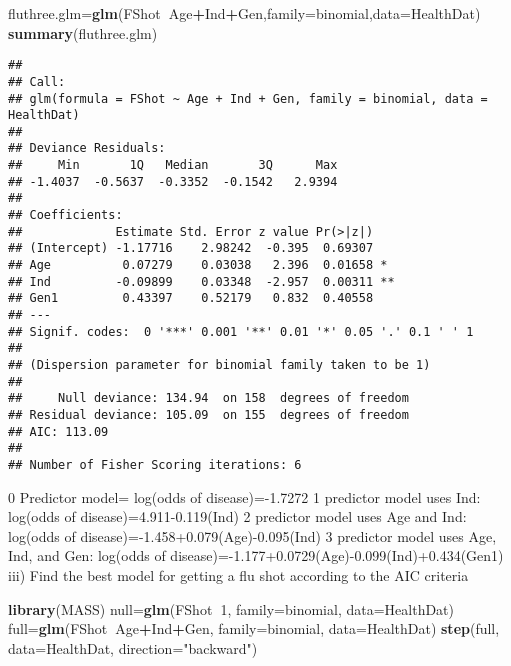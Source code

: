 \documentclass[]{article}
\newenvironment{Shaded}{\begin{snugshade}}{\end{snugshade}}
\newcommand{\KeywordTok}[1]{\textcolor[rgb]{0.13,0.29,0.53}{\textbf{#1}}}
\newcommand{\DataTypeTok}[1]{\textcolor[rgb]{0.13,0.29,0.53}{#1}}
\newcommand{\DecValTok}[1]{\textcolor[rgb]{0.00,0.00,0.81}{#1}}
\newcommand{\StringTok}[1]{\textcolor[rgb]{0.31,0.60,0.02}{#1}}
\newcommand{\OperatorTok}[1]{\textcolor[rgb]{0.81,0.36,0.00}{\textbf{#1}}}
\newcommand{\NormalTok}[1]{#1}
\begin{document}
\begin{Shaded}
\begin{Highlighting}[]
\NormalTok{fluthree.glm=}\KeywordTok{glm}\NormalTok{(FShot}\OperatorTok{~}\NormalTok{Age}\OperatorTok{+}\NormalTok{Ind}\OperatorTok{+}\NormalTok{Gen,}\DataTypeTok{family=}\NormalTok{binomial,}\DataTypeTok{data=}\NormalTok{HealthDat)}
\KeywordTok{summary}\NormalTok{(fluthree.glm)}
\end{Highlighting}
\end{Shaded}

\begin{verbatim}
## 
## Call:
## glm(formula = FShot ~ Age + Ind + Gen, family = binomial, data = HealthDat)
## 
## Deviance Residuals: 
##     Min       1Q   Median       3Q      Max  
## -1.4037  -0.5637  -0.3352  -0.1542   2.9394  
## 
## Coefficients:
##             Estimate Std. Error z value Pr(>|z|)   
## (Intercept) -1.17716    2.98242  -0.395  0.69307   
## Age          0.07279    0.03038   2.396  0.01658 * 
## Ind         -0.09899    0.03348  -2.957  0.00311 **
## Gen1         0.43397    0.52179   0.832  0.40558   
## ---
## Signif. codes:  0 '***' 0.001 '**' 0.01 '*' 0.05 '.' 0.1 ' ' 1
## 
## (Dispersion parameter for binomial family taken to be 1)
## 
##     Null deviance: 134.94  on 158  degrees of freedom
## Residual deviance: 105.09  on 155  degrees of freedom
## AIC: 113.09
## 
## Number of Fisher Scoring iterations: 6
\end{verbatim}

0 Predictor model= log(odds of disease)=-1.7272 1 predictor model uses
Ind: log(odds of disease)=4.911-0.119(Ind) 2 predictor model uses Age
and Ind: log(odds of disease)=-1.458+0.079(Age)-0.095(Ind) 3 predictor
model uses Age, Ind, and Gen: log(odds of
disease)=-1.177+0.0729(Age)-0.099(Ind)+0.434(Gen1) iii) Find the best
model for getting a flu shot according to the AIC criteria

\begin{Shaded}
\begin{Highlighting}[]
\KeywordTok{library}\NormalTok{(MASS)}
\NormalTok{null=}\KeywordTok{glm}\NormalTok{(FShot}\OperatorTok{~}\DecValTok{1}\NormalTok{, }\DataTypeTok{family=}\NormalTok{binomial, }\DataTypeTok{data=}\NormalTok{HealthDat)}
\NormalTok{full=}\KeywordTok{glm}\NormalTok{(FShot}\OperatorTok{~}\NormalTok{Age}\OperatorTok{+}\NormalTok{Ind}\OperatorTok{+}\NormalTok{Gen, }\DataTypeTok{family=}\NormalTok{binomial, }\DataTypeTok{data=}\NormalTok{HealthDat)}
\KeywordTok{step}\NormalTok{(full, }\DataTypeTok{data=}\NormalTok{HealthDat, }\DataTypeTok{direction=}\StringTok{"backward"}\NormalTok{)}
\end{Highlighting}
\end{Shaded}
\end{document}
